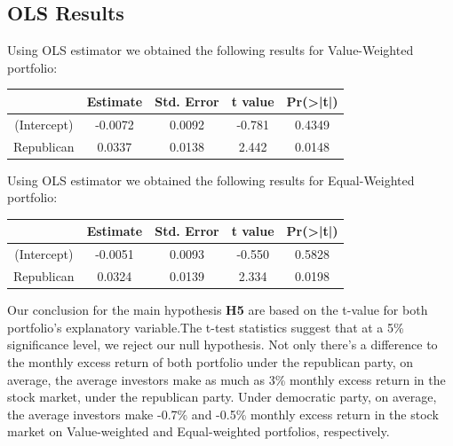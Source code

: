 \documentclass[a4paper]{article}
\begin{document}
\vspace{-10pt}
\subsection{OLS Results}\label{Results}
\vspace{-10pt}
\hspace{12pt}  Using OLS estimator we obtained the following results for Value-Weighted portfolio: 

\begin{center}
\begin{tabular}{||c c c c c||} 
 \hline
  & Estimate & Std. Error & t value & Pr(>|t|) \\ [0.5ex] 
 \hline\hline
 (Intercept) &  -0.0072 & 0.0092 & -0.781 & 0.4349  \\ 
 \hline
 Republican   & 0.0337  & 0.0138 &  2.442 &  0.0148 \\
 \hline

\end{tabular}
\end{center}

Using OLS estimator we obtained the following results for Equal-Weighted portfolio: 

\begin{center}
\begin{tabular}{||c c c c c||} 
 \hline
  & Estimate & Std. Error & t value & Pr(>|t|) \\ [0.5ex] 
 \hline\hline
 (Intercept) &  -0.0051 & 0.0093 & -0.550 & 0.5828  \\ 
 \hline
 Republican   & 0.0324  & 0.0139 &  2.334 & 0.0198 \\
 \hline

\end{tabular}
\end{center}

Our conclusion for the main hypothesis \textbf{H5} are based on the t-value for both portfolio's explanatory variable.The t-test statistics suggest that at a 5\% significance level, we reject our null hypothesis. Not only there's a difference to the monthly excess return of both portfolio under the republican party, on average, the average investors make as much as 3\% monthly excess return in the stock market, under the republican party. Under democratic party, on average, the average investors make -0.7\% and -0.5\% monthly excess return in the stock market on Value-weighted and Equal-weighted portfolios, respectively. 


\vspace{-10pt}
\end{document}
